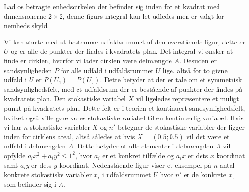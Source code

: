 \documentclass[../../SRP.tex]{subfiles}
\begin{document}
Lad os betragte enhedscirkelen der befinder sig inden for et kvadrat med dimensionerne $2\times 2$, denne figurs integral kan let udledes men er valgt for nemheds skyld.\\



\begin{center}
\end{center}

Vi kan starte med at bestemme udfaldsrummet af den overstående figur, dette er $U$ og er alle de punkter der findes i kvadratets plan. Det integral vi ønsker at finde er cirklen, hvorfor vi lader cirklen være delmængde $A$. Desuden er sandsynligheden $P$ for alle udfald i udfaldsrummet $U$ lige, altså for to givne udfald i $U$ er $P(U_1) = P(U_2)$. Dette betyder at der er tale om et symmetrisk sandsynlighedsfelt, med et udfaldsrum der er bestående af punkter der findes på kvadratets plan. Den stokastiske variabel $X$ vil ligeledes repræsentere et muligt punkt på kvadratets plan. Dette felt er i teorien et kontinuert sandsynlighedsfelt, hvilket også ville gøre vores stokastiske variabel til en kontinuerlig variabel. Hvis vi har $n$ stokastiske variabler $X$ og $n'$ betegner de stokastiske variabler der ligger inden for cirklens areal, altså således at hvis $X = (0.5;0.5)$ vil det være et udfald i delmængden $A$. Dette betyder at alle elementer i delmængden $A$ vil opfylde $a_ix^2+a_iy^2 \leq 1^2$, hvor $a_i$ er et konkret tilfælde og $a_ix$ er dets $x$ koordinat samt $a_iy$ er dets $y$ koordinat. Nedenstående figur viser et eksempel på $n$ antal konkrete stokastiske variabler $x_i$ i udfaldsrummet $U$ hvor $n'$ er de konkrete $x_i$ som befinder sig i $A$.

\begin{center}
\end{center}
\end{document}
